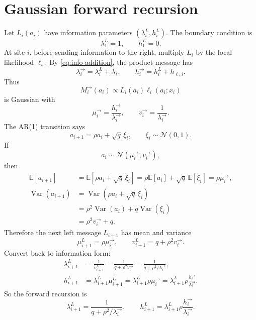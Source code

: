 \documentclass[11pt]{article}
\newcommand{\E}{\mathbb{E}}
\newcommand{\N}{\mathcal{N}}
\begin{document}
\section{Gaussian forward recursion}

Let \(L_i(a_i)\) have information parameters \((\lambda_i^L,h_i^L)\). The boundary condition is
\begin{equation}
  \lambda_1^L=1,
  \qquad
  h_1^L=0.
\end{equation}
At site \(i\), before sending information to the right, multiply \(L_i\) by the local likelihood \(\ell_i\). By \eqref{eq:info-addition}, the product message has
\begin{equation}
  \lambda_i^{\to}=\lambda_i^L+\lambda_\ell,
  \qquad
  h_i^{\to}=h_i^L+h_{\ell,i}.
\end{equation}
Thus
\begin{equation}
  M_i^{\to}(a_i)
  \propto
  L_i(a_i)\ell_i(a_i;x_i)
\end{equation}
is Gaussian with
\begin{equation}
  \mu_i^{\to}=\frac{h_i^{\to}}{\lambda_i^{\to}},
  \qquad
  v_i^{\to}=\frac{1}{\lambda_i^{\to}}.
\end{equation}
The AR(1) transition says
\begin{equation}
  a_{i+1}=\rho a_i+\sqrt q\,\xi_i,
  \qquad \xi_i\sim\N(0,1).
\end{equation}
If
\[
  a_i\sim\N(\mu_i^{\to},v_i^{\to}),
\]
then
\begin{align}
  \E[a_{i+1}]&=\E[\rho a_i+\sqrt q\,\xi_i]
  =\rho \E[a_i]+\sqrt q\,\E[\xi_i]
  =\rho \mu_i^{\to}, \\
  \operatorname{Var}(a_{i+1})
  &=\operatorname{Var}(\rho a_i+\sqrt q\,\xi_i) \\
  &=\rho^2\operatorname{Var}(a_i)+q\operatorname{Var}(\xi_i) \\
  &=\rho^2v_i^{\to}+q.
\end{align}
Therefore the next left message \(L_{i+1}\) has mean and variance
\begin{equation}
  \mu_{i+1}^L=\rho\mu_i^{\to},
  \qquad
  v_{i+1}^L=q+\rho^2v_i^{\to}.
\end{equation}
Convert back to information form:
\begin{align}
  \lambda_{i+1}^L
  &=\frac{1}{v_{i+1}^L}
  =\frac{1}{q+\rho^2v_i^{\to}}
  =\frac{1}{q+\rho^2/\lambda_i^{\to}}, \\
  h_{i+1}^L
  &=\lambda_{i+1}^L\mu_{i+1}^L
  =\lambda_{i+1}^L\rho\mu_i^{\to}
  =\lambda_{i+1}^L\rho\frac{h_i^{\to}}{\lambda_i^{\to}}.
\end{align}
So the forward recursion is
\begin{equation}
  \boxed{
  \lambda_{i+1}^L=\frac{1}{q+\rho^2/\lambda_i^{\to}},
  \qquad
  h_{i+1}^L=\lambda_{i+1}^L\rho\frac{h_i^{\to}}{\lambda_i^{\to}}.
  }
\end{equation}
\end{document}
